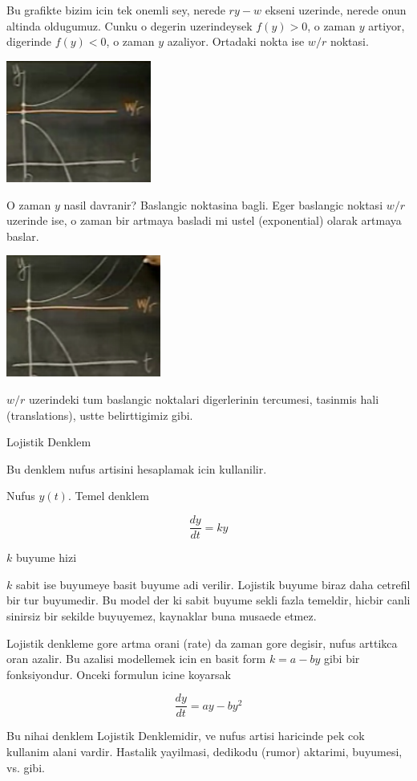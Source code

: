 \documentclass[12pt,fleqn]{article}\usepackage{../common}
\begin{document}
Bu grafikte bizim icin tek onemli sey, nerede $ry-w$ ekseni uzerinde,
nerede onun altinda oldugumuz. Cunku o degerin uzerindeysek $f(y) > 0$, o
zaman $y$ artiyor, digerinde $f(y) < 0$, o zaman $y$ azaliyor. Ortadaki
nokta ise $w/r$ noktasi.

\includegraphics[height=4cm]{5_5.png}

O zaman $y$ nasil davranir? Baslangic noktasina bagli. Eger baslangic
noktasi $w/r$ uzerinde ise, o zaman bir artmaya basladi mi ustel
(exponential) olarak artmaya baslar.

\includegraphics[height=4cm]{5_6.png}

$w/r$ uzerindeki tum baslangic noktalari digerlerinin tercumesi, tasinmis
hali (translations), ustte belirttigimiz gibi. 

Lojistik Denklem

Bu denklem nufus artisini hesaplamak icin kullanilir. 

Nufus $y(t)$.  Temel denklem

\[ \frac{dy}{dt} = ky\]

$k$ buyume hizi

$k$ sabit ise buyumeye basit buyume adi verilir. Lojistik buyume biraz daha
cetrefil bir tur buyumedir. Bu model der ki sabit buyume sekli fazla
temeldir, hicbir canli sinirsiz bir sekilde buyuyemez, kaynaklar buna
musaede etmez. 

Lojistik denkleme gore artma orani (rate) da zaman gore degisir, nufus
arttikca oran azalir. Bu azalisi modellemek icin en basit form $k = a - by$
gibi bir fonksiyondur. Onceki formulun icine koyarsak

\[ \frac{dy}{dt} = ay - by^2 \]

Bu nihai denklem Lojistik Denklemidir, ve nufus artisi haricinde pek cok
kullanim alani vardir. Hastalik yayilmasi, dedikodu (rumor) aktarimi,
buyumesi, vs. gibi.
\end{document}
